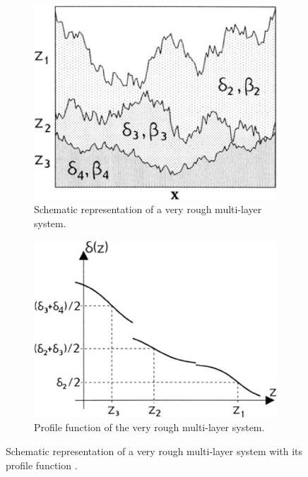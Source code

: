 \begin{figure}
    \hfill
    \begin{subfigure}{0.35\textwidth}
        \includegraphics[width=\textwidth]{images/rough_layer.png}
        \caption{Schematic representation of a very rough multi-layer system.}
    \end{subfigure}
    \hfill
    \begin{subfigure}{0.35\textwidth}
        \includegraphics[width=\textwidth]{images/rough_function.png}
        \caption{Profile function of the very rough multi-layer system.}
    \end{subfigure}
    \caption{Schematic representation of a very rough multi-layer system with its profile function \cite[28]{V44:xrr_tolan}.}
    \label{fig:independent_layers}
    \hfill
\end{figure}


